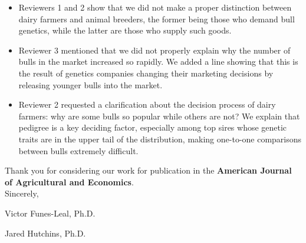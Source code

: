 \documentclass[12pt]{article}
\begin{document}
\begin{itemize}
    \item Reviewers 1 and 2 show that we did not make a proper distinction between dairy farmers and animal breeders, the former being those who demand bull genetics, while the latter are those who supply such goods.
    \item Reviewer 3 mentioned that we did not properly explain why the number of bulls in the market increased so rapidly. We added a line showing that this is the result of genetics companies changing their marketing decisions by releasing younger bulls into the market.
    \item Reviewer 2 requested a clarification about the decision process of dairy farmers: why are some bulls so popular while others are not? We explain that pedigree is a key deciding factor, especially among top sires whose genetic traits are in the upper tail of the distribution, making one-to-one comparisons between bulls extremely difficult.
    \end{itemize}

Thank you for considering our work for publication in the \textbf{American Journal of Agricultural and Economics}.
\\

Sincerely,

Victor Funes-Leal, Ph.D.

Jared Hutchins, Ph.D.
\end{document}
